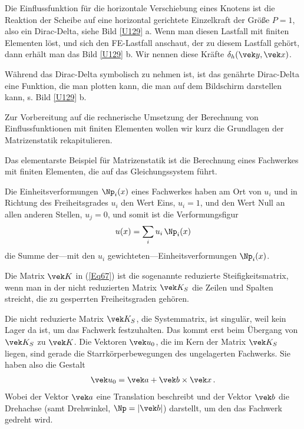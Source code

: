 {Die Einflussfunktion f\"{u}r die horizontale Verschiebung eines Knotens ist die Reaktion der Scheibe auf eine horizontal gerichtete Einzelkraft der Gr\"{o}{\ss}e $P = 1$, also ein Dirac-Delta, siehe Bild  \ref{U129} a. Wenn man diesen Lastfall mit finiten Elementen l\"{o}st, und sich den FE-Lastfall anschaut, der zu diesem Lastfall geh\"{o}rt, dann erh\"{a}lt man das Bild \ref{U129} b. Wir nennen diese Kr\"{a}fte $\delta_h(\vek y,\vek x)$.

W\"{a}hrend das Dirac-Delta symbolisch zu nehmen ist, ist das gen\"{a}hrte Dirac-Delta eine Funktion, die man plotten kann, die man auf dem Bildschirm darstellen kann, s. Bild \ref{U129} b.

Zur Vorbereitung auf die rechnerische Umsetzung der Berechnung von Einflussfunktionen mit finiten Elementen wollen wir kurz die Grundlagen der Matrizenstatik rekapitulieren.

Das elementarste Beispiel f\"{u}r Matrizenstatik ist die Berechnung eines Fachwerkes mit finiten Elementen, die auf das Gleichungssystem
f\"{u}hrt.

Die Einheitsverformungen $\Np_i(x)$ eines Fachwerkes haben am Ort von $u_i$ und in Richtung des Freiheitsgrades $u_i$ den Wert Eins, $u_i = 1$, und den Wert Null an allen anderen Stellen,  $u_j = 0$, und somit ist die Verformungsfigur
\begin{align}
u(x) = \sum_i u_i\,\Np_i(x)
\end{align}
die Summe der---mit den $u_i$ gewichteten---Einheitsverformungen $\Np_i(x)$.

Die Matrix $\vek K $ in (\ref{Eq67}) ist die sogenannte reduzierte Steifigkeitsmatrix, wenn man in der nicht reduzierten Matrix $ \vek K_S$ die Zeilen und Spalten streicht, die zu gesperrten Freiheitsgraden geh\"{o}ren.

Die nicht reduzierte Matrix $\vek K_S $, die Systemmatrix, ist singul\"{a}r, weil kein Lager da ist, um das Fachwerk festzuhalten. Das kommt erst beim \"{U}bergang von $\vek K_S $ zu $\vek K$. Die Vektoren $\vek u_0$, die im Kern der Matrix $ \vek K_S $ liegen, sind gerade die Starrk\"{o}rperbewegungen des ungelagerten Fachwerks. Sie haben also die Gestalt
\begin{align}
\vek u_0 = \vek a + \vek b \times \vek x\,.
\end{align}
Wobei der Vektor $\vek a $ eine Translation beschreibt und der Vektor $\vek b $ die Drehachse (samt Drehwinkel, $\Np = |\vek b|$) darstellt, um den das Fachwerk gedreht wird.


}
